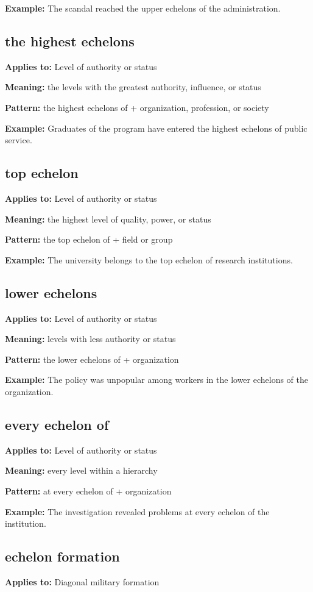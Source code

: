 \documentclass[11pt]{article}
\begin{document}
\textbf{Example:} The scandal reached the upper echelons of the administration.

\subsection{the highest echelons}
\textbf{Applies to:} Level of authority or status

\textbf{Meaning:} the levels with the greatest authority, influence, or status

\textbf{Pattern:} the highest echelons of + organization, profession, or society

\textbf{Example:} Graduates of the program have entered the highest echelons of public service.

\subsection{top echelon}
\textbf{Applies to:} Level of authority or status

\textbf{Meaning:} the highest level of quality, power, or status

\textbf{Pattern:} the top echelon of + field or group

\textbf{Example:} The university belongs to the top echelon of research institutions.

\subsection{lower echelons}
\textbf{Applies to:} Level of authority or status

\textbf{Meaning:} levels with less authority or status

\textbf{Pattern:} the lower echelons of + organization

\textbf{Example:} The policy was unpopular among workers in the lower echelons of the organization.

\subsection{every echelon of}
\textbf{Applies to:} Level of authority or status

\textbf{Meaning:} every level within a hierarchy

\textbf{Pattern:} at every echelon of + organization

\textbf{Example:} The investigation revealed problems at every echelon of the institution.

\subsection{echelon formation}
\textbf{Applies to:} Diagonal military formation
\end{document}
